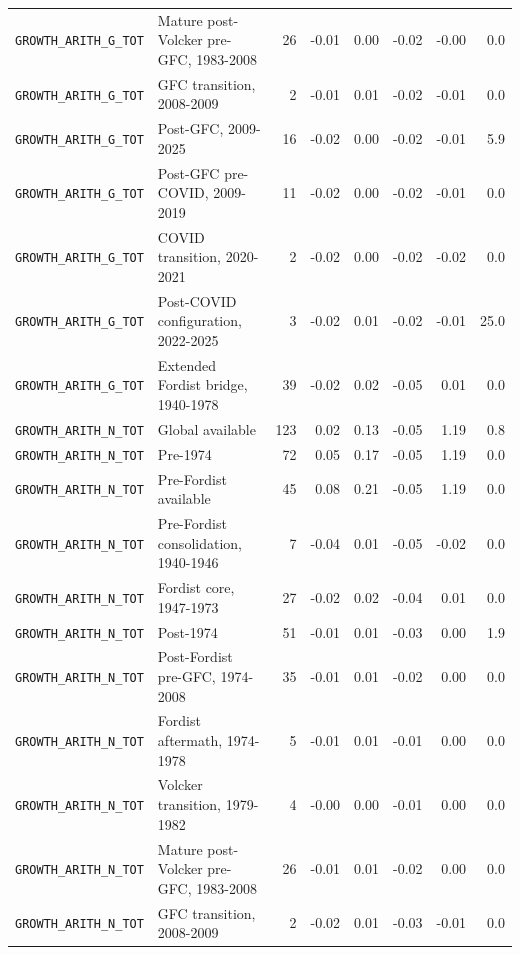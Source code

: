 \begin{landscape}
\begin{longtable}{p{4.4cm}p{3.8cm}rrrrrr}
\\
\nolinkurl{GROWTH_ARITH_G_TOT} & Mature post-Volcker pre-GFC, 1983-2008 & 26 & -0.01 & 0.00 & -0.02 & -0.00 & 0.0
\\
\nolinkurl{GROWTH_ARITH_G_TOT} & GFC transition, 2008-2009 & 2 & -0.01 & 0.01 & -0.02 & -0.01 & 0.0
\\
\nolinkurl{GROWTH_ARITH_G_TOT} & Post-GFC, 2009-2025 & 16 & -0.02 & 0.00 & -0.02 & -0.01 & 5.9
\\
\nolinkurl{GROWTH_ARITH_G_TOT} & Post-GFC pre-COVID, 2009-2019 & 11 & -0.02 & 0.00 & -0.02 & -0.01 & 0.0
\\
\nolinkurl{GROWTH_ARITH_G_TOT} & COVID transition, 2020-2021 & 2 & -0.02 & 0.00 & -0.02 & -0.02 & 0.0
\\
\nolinkurl{GROWTH_ARITH_G_TOT} & Post-COVID configuration, 2022-2025 & 3 & -0.02 & 0.01 & -0.02 & -0.01 & 25.0
\\
\nolinkurl{GROWTH_ARITH_G_TOT} & Extended Fordist bridge, 1940-1978 & 39 & -0.02 & 0.02 & -0.05 & 0.01 & 0.0
\\
\nolinkurl{GROWTH_ARITH_N_TOT} & Global available & 123 & 0.02 & 0.13 & -0.05 & 1.19 & 0.8
\\
\nolinkurl{GROWTH_ARITH_N_TOT} & Pre-1974 & 72 & 0.05 & 0.17 & -0.05 & 1.19 & 0.0
\\
\nolinkurl{GROWTH_ARITH_N_TOT} & Pre-Fordist available & 45 & 0.08 & 0.21 & -0.05 & 1.19 & 0.0
\\
\nolinkurl{GROWTH_ARITH_N_TOT} & Pre-Fordist consolidation, 1940-1946 & 7 & -0.04 & 0.01 & -0.05 & -0.02 & 0.0
\\
\nolinkurl{GROWTH_ARITH_N_TOT} & Fordist core, 1947-1973 & 27 & -0.02 & 0.02 & -0.04 & 0.01 & 0.0
\\
\nolinkurl{GROWTH_ARITH_N_TOT} & Post-1974 & 51 & -0.01 & 0.01 & -0.03 & 0.00 & 1.9
\\
\nolinkurl{GROWTH_ARITH_N_TOT} & Post-Fordist pre-GFC, 1974-2008 & 35 & -0.01 & 0.01 & -0.02 & 0.00 & 0.0
\\
\nolinkurl{GROWTH_ARITH_N_TOT} & Fordist aftermath, 1974-1978 & 5 & -0.01 & 0.01 & -0.01 & 0.00 & 0.0
\\
\nolinkurl{GROWTH_ARITH_N_TOT} & Volcker transition, 1979-1982 & 4 & -0.00 & 0.00 & -0.01 & 0.00 & 0.0
\\
\nolinkurl{GROWTH_ARITH_N_TOT} & Mature post-Volcker pre-GFC, 1983-2008 & 26 & -0.01 & 0.01 & -0.02 & 0.00 & 0.0
\\
\nolinkurl{GROWTH_ARITH_N_TOT} & GFC transition, 2008-2009 & 2 & -0.02 & 0.01 & -0.03 & -0.01 & 0.0
\\

\end{longtable}
\end{landscape}
